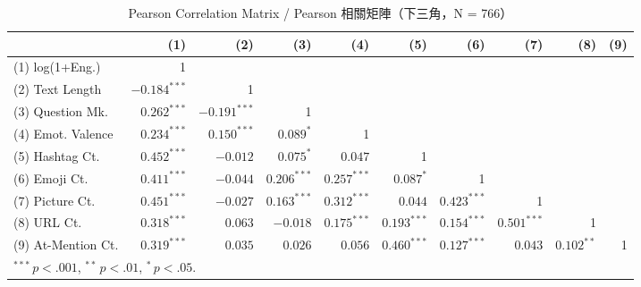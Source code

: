 \documentclass[12pt,a4paper,fontset=none]{ctexart}
\begin{document}
\begin{table}[htbp]
\centering
\caption{Pearson Correlation Matrix / Pearson 相關矩陣（下三角，N = 766）}
\label{tab:corr}
\small
\setlength{\tabcolsep}{3pt}
\begin{tabular}{lrrrrrrrrr}
\toprule
 & (1) & (2) & (3) & (4) & (5) & (6) & (7) & (8) & (9) \\
\midrule
(1) log(1+Eng.) & 1 & & & & & & & & \\
(2) Text Length & $-0.184^{***}$ & 1 & & & & & & & \\
(3) Question Mk. & $0.262^{***}$ & $-0.191^{***}$ & 1 & & & & & & \\
(4) Emot. Valence & $0.234^{***}$ & $0.150^{***}$ & $0.089^{*}$ & 1 & & & & & \\
(5) Hashtag Ct. & $0.452^{***}$ & $-0.012$ & $0.075^{*}$ & $0.047$ & 1 & & & & \\
(6) Emoji Ct. & $0.411^{***}$ & $-0.044$ & $0.206^{***}$ & $0.257^{***}$ & $0.087^{*}$ & 1 & & & \\
(7) Picture Ct. & $0.451^{***}$ & $-0.027$ & $0.163^{***}$ & $0.312^{***}$ & $0.044$ & $0.423^{***}$ & 1 & & \\
(8) URL Ct. & $0.318^{***}$ & $0.063$ & $-0.018$ & $0.175^{***}$ & $0.193^{***}$ & $0.154^{***}$ & $0.501^{***}$ & 1 & \\
(9) At-Mention Ct. & $0.319^{***}$ & $0.035$ & $0.026$ & $0.056$ & $0.460^{***}$ & $0.127^{***}$ & $0.043$ & $0.102^{**}$ & 1 \\
\bottomrule
\multicolumn{10}{l}{\small $^{***}\,p<.001$,\; $^{**}\,p<.01$,\; $^*\,p<.05$.} \\
\end{tabular}
\end{table}

\vspace{1em}
\end{document}
